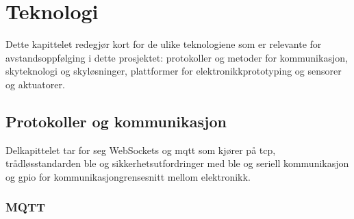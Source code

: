 \chapter{Teknologi}
\label{ch:technology}
Dette kapittelet redegjør kort for de ulike teknologiene som er relevante
for avstandsoppfølging i dette prosjektet: protokoller og metoder
for kommunikasjon, skyteknologi og skyløsninger, plattformer for elektronikkprototyping og sensorer og aktuatorer.

\section{Protokoller og kommunikasjon}
Delkapittelet tar for seg WebSockets og \gls{mqtt} som kjører
på \gls{tcp}, trådløsstandarden \gls{ble} og sikkerhetsutfordringer med \gls{ble} og seriell kommunikasjon og \gls{gpio} for kommunikasjongrensesnitt mellom elektronikk.

\subsection{MQTT} %

